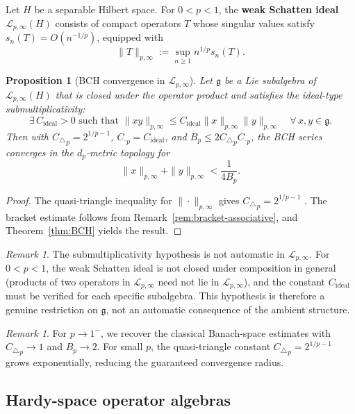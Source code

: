 \documentclass[10pt]{amsart}
\newtheorem{proposition}[theorem]{Proposition}
\theoremstyle{definition}
\theoremstyle{remark}
\newtheorem{remark}[theorem]{Remark}
\numberwithin{equation}{section}
\newcommand{\Ctri}{C_{\triangle}}    %
\newcommand{\Cmult}{C_{\cdot}}       %
\newcommand{\Cbracket}{B}            %
\begin{document}
Let $H$ be a separable Hilbert space.  For $0<p<1$, the \textbf{weak Schatten ideal}
$\mathcal{L}_{p,\infty}(H)$ consists of compact operators $T$ whose singular values
satisfy $s_n(T) = O(n^{-1/p})$, equipped with
\[
  \|T\|_{p,\infty} := \sup_{n\ge 1} n^{1/p} s_n(T).
\]



\begin{proposition}[BCH convergence in $\mathcal{L}_{p,\infty}$]\label{prop:schatten}
Let $\mathfrak{g}$ be a Lie subalgebra of $\mathcal{L}_{p,\infty}(H)$ that is closed
under the operator product and satisfies the ideal-type submultiplicativity:
\[
  \exists\, C_{\mathrm{ideal}}>0 \text{ such that }
  \|xy\|_{p,\infty} \le C_{\mathrm{ideal}}\|x\|_{p,\infty}\|y\|_{p,\infty}
  \quad\forall\, x,y\in\mathfrak{g}.
\]
Then with ${\Ctri}_{p} = 2^{1/p - 1}$, ${\Cmult}_{p} = C_{\mathrm{ideal}}$, and
${\Cbracket}_{p} \le 2{\Ctri}_{p}{\Cmult}_{p}$, the BCH series converges in the
$d_p$-metric topology for
\[
  \|x\|_{p,\infty} + \|y\|_{p,\infty} < \frac{1}{4{\Cbracket}_{p}}.
\]
\end{proposition}

\begin{proof}
The quasi-triangle inequality for $\|\cdot\|_{p,\infty}$ gives
${\Ctri}_{p} = 2^{1/p - 1}$ \cite[Lemma~2.1]{KaltonSukochev2021}.  The bracket estimate
follows from Remark~\ref{rem:bracket-associative}, and Theorem~\ref{thm:BCH} yields the
result.
\end{proof}

\begin{remark}
The submultiplicativity hypothesis is not automatic in $\mathcal{L}_{p,\infty}$.  For
$0 < p < 1$, the weak Schatten ideal is not closed under composition in general
(products of two operators in $\mathcal{L}_{p,\infty}$ need not lie in
$\mathcal{L}_{p,\infty}$), and the constant $C_{\mathrm{ideal}}$ must be verified for
each specific subalgebra.  This hypothesis is therefore a genuine restriction on
$\mathfrak{g}$, not an automatic consequence of the ambient structure.
\end{remark}

\begin{remark}
For $p\to 1^-$, we recover the classical Banach-space estimates with ${\Ctri}_{p}\to 1$
and ${\Cbracket}_{p}\to 2$.  For small $p$, the quasi-triangle constant
${\Ctri}_{p} = 2^{1/p-1}$ grows exponentially, reducing the guaranteed convergence radius.
\end{remark}

\subsection{Hardy-space operator algebras}
\end{document}
